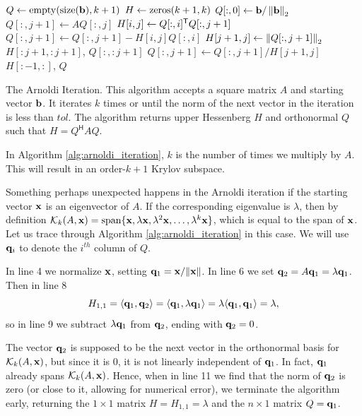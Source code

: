 \begin{algorithm}
\begin{algorithmic}[1]
	\State $Q \gets \allocate{\size{\b}}{k+1}$			
	\State $H \gets \zeros{ k+1}{ k}$
	\State $Q[:,0] \gets {\bf b}/\left\lVert{\bf b}\right\rVert_2$							
								
		\State $Q[:,j+1] \gets AQ[:,j]$		
							
			\State $H[i,j] \gets Q[:,i]^{\mathsf T} Q[:,j+1]$		
			\State $Q[:,j+1] \gets Q[:,j+1] - H[i,j] Q[:,i]$
		\EndFor
		\State $H[j+1,j] \gets \left\lVert Q[:,j+1]\right\rVert_2$			
            					
			\State {} $H[:j+1,:j+1]$, $Q[:,:j+1]$
		\EndIf
		\State $Q[:,j+1] \gets Q[:,j+1]/H[j+1,j]$				
	\EndFor
	\State {} $H[:-1, :]$, $Q$			
\EndProcedure
\end{algorithmic}
\caption{The Arnoldi Iteration. This algorithm accepts a square matrix $A$ and starting vector ${\bf b}$. It iterates $k$ times or until the norm of the next vector in the iteration is less than $tol$.
The algorithm returns upper Hessenberg $H$ and orthonormal $Q$ such that $H = Q^{\mathsf{H}}AQ$.}
\label{alg:arnoldi_iteration}
\end{algorithm}


In Algorithm \ref{alg:arnoldi_iteration}, $k$ is the number of times we multiply by $A$.
This will result in an order-$k+1$ Krylov subspace.

Something perhaps unexpected happens in the Arnoldi iteration if the starting vector ${\bf x}$ is an eigenvector of $A$.
If the corresponding eigenvalue is $\lambda$, then by definition $\mathcal{K}_k(A, {\bf x})=\text{span}\{{\bf x}, \lambda {\bf x}, \lambda^2{\bf x}, \ldots, \lambda^k {\bf x}\}$, which is equal to the span of ${\bf x}$.
Let us trace through Algorithm \ref{alg:arnoldi_iteration} in this case. We will use ${\bf q}_i$ to denote the $i^{th}$ column of $Q$.

In line 4 we normalize ${\bf x}$, setting ${\bf q}_1 = {\bf x}/\|{\bf x}\|$. 
In line 6 we set ${\bf q}_2 = A{\bf q}_1 = \lambda {\bf q}_1$.
Then in line 8
\[
H_{1,1} = \langle {\bf q}_1, {\bf q}_2 \rangle = \langle {\bf q}_1, \lambda {\bf q}_1 \rangle = \lambda \langle {\bf q}_1, {\bf q}_1 \rangle = \lambda,
\]
so in line 9 we subtract $\lambda {\bf q}_1$ from ${\bf q}_2$, ending with ${\bf q}_2=0$.

The vector ${\bf q}_2$ is supposed to be the next vector in the orthonormal basis for $\mathcal{K}_k(A, {\bf x})$, but since it is 0, it is not linearly independent of ${\bf q}_1$. In fact, ${\bf q}_1$ already spans $\mathcal{K}_k(A, {\bf x})$.
Hence, when in line 11 we find that the norm of ${\bf q}_2$ is zero (or close to it, allowing for numerical error), we terminate the algorithm early, returning the $1\times 1$ matrix $H = H_{1, 1}=\lambda$ and the $n\times 1$ matrix $Q = {\bf q}_1$.

